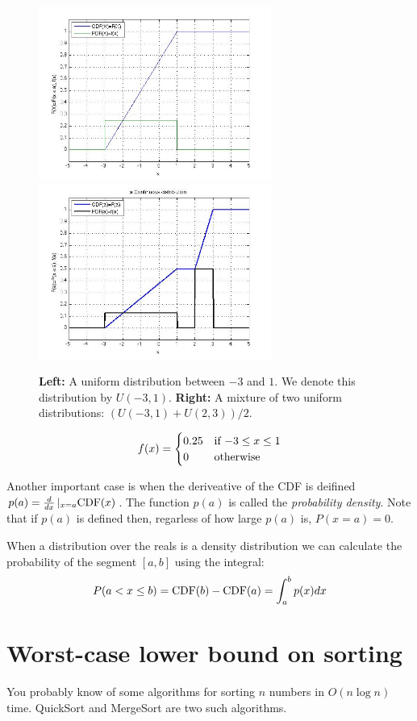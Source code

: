 \documentclass{report}
\theoremstyle{plain}
\theoremstyle{definition}
\begin{document}
\begin{figure}[t]
\begin{center}
\includegraphics[width=3in]{figs/Uniform.jpg}
\includegraphics[width=3in]{figs/unifMixture2CDF.jpg}
\end{center}
\caption{{\bf Left:} A uniform distribution between $-3$ and $1$. We
  denote this distribution by $U(-3,1)$. {\bf Right:} A mixture of two
  uniform distributions: $(U(-3,1)+U(2,3))/2$.}
\end{figure}

\[
f(x) = \begin{cases}
0.25 & \mbox{if $ -3 \leq x \leq 1$} \\
0 & \mbox{otherwise}
\end{cases}
\]

Another important case is when the deriveative of the CDF is deifined
$p(a) = \frac{d}{dx}\left|_{x=a} \mbox{CDF}(x)\right.$. The function $p(a)$
is called the {\em probability density}. Note that if $p(a)$ is
defined then, regarless of how large $p(a)$ is, $P(x=a)=0$.

When a distribution over the reals is a density distribution we can
calculate the probability of the segment $[a,b]$ using the integral:
\[
P(a < x \leq b)=\mbox{CDF}(b)-\mbox{CDF}(a)=\int_a^b p(x) dx
\]

\section{Worst-case lower bound on sorting}
You probably know of some algorithms for sorting $n$ numbers in
$O(n\log n)$ time. QuickSort and MergeSort are two such algorithms.
\end{document}
